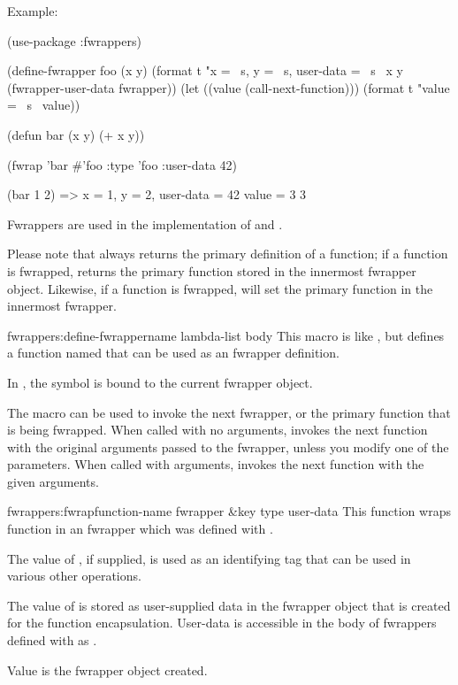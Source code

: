 Example:

\begin{lisp}
(use-package :fwrappers)

(define-fwrapper foo (x y)
  (format t "x = ~s, y = ~s, user-data = ~s~%
          x y (fwrapper-user-data fwrapper))
  (let ((value (call-next-function)))
    (format t "value = ~s~%
    value))

(defun bar (x y)
  (+ x y))

(fwrap 'bar #'foo :type 'foo :user-data 42)

(bar 1 2)
 =>
 x = 1, y = 2, user-data = 42
 value = 3
 3   
\end{lisp}

Fwrappers are used in the implementation of  and
.

Please note that  always returns the primary
definition of a function; if a function is fwrapped,
 returns the primary function stored in the
innermost fwrapper object.  Likewise, if a function is fwrapped,
 will set the primary function in the
innermost fwrapper.

\begin{defmac}{fwrappers:}{define-fwrapper}{name lambda-list \ampbody body}
  This macro is like , but defines a function named
   that can be used as an fwrapper definition.
  
  In , the symbol  is bound to the current
  fwrapper object.
  
  The macro  can be used to invoke the next
  fwrapper, or the primary function that is being fwrapped.  When
  called with no arguments,  invokes the next
  function with the original arguments passed to the fwrapper, unless
  you modify one of the parameters.  When called with arguments,
   invokes the next function with the given
  arguments.
\end{defmac}

\begin{defun}{fwrappers:}{fwrap}{function-name fwrapper \&key type
    user-data}
  This function wraps function  in an fwrapper
   which was defined with .

  The value of , if supplied, is used as an identifying
  tag that can be used in various other operations.
  
  The value of  is stored as user-supplied data in the
  fwrapper object that is created for the function encapsulation.
  User-data is accessible in the body of fwrappers defined with
   as .

  Value is the fwrapper object created.
\end{defun}

